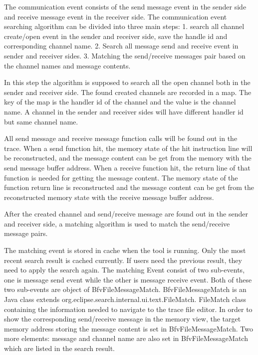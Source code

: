 The communication event consists of the send message event in the sender side and receive message event in the receiver side. The communication event searching algorithm can be divided into three main steps: 1. search all channel create/open event in the sender and receiver side, save the handle id and corresponding channel name. 2. Search all message send and receive event in sender and receiver sides. 3. Matching the send/receive messages pair based on the channel names and message contents.

In this step the algorithm is supposed to search all the open channel both in the sender and receiver side. The found created channels are recorded in a map. The key of the map is the handler id of the channel and the value is the channel name. A channel in the sender and receiver sides will have different handler id but same channel name.

All send message and receive message function calls will be found out in the trace. When a send function hit, the memory state of the hit instruction line will be reconstructed, and the message content can be get from the memory with the send message buffer address. When a receive function hit, the return line of that function is needed for getting the message content. The memory state of the function return line is reconstructed and the message content can be get  from the reconstructed memory state with the receive message buffer address.

After the created channel and send/receive message are found out in the sender and receiver side, a matching algorithm is used to match the send/receive message pairs.

The matching event is stored in cache when the tool is running. Only the most recent search result is cached currently. If users need the previous result, they need to apply the search again. The matching Event consist of two sub-events, one is message send event while the other is message receive event. Both of these two sub-events are object of BfvFileMessageMatch. BfvFileMessageMatch is an Java class extends org.eclipse.search.internal.ui.text.FileMatch. FileMatch class containing the information needed to navigate to the trace file editor. In order to show the corresponding send/receive message in the memory view, the target memory address storing the message content is set in BfvFileMessageMatch. Two more elements: message and channel name are also set in BfvFileMessageMatch which are listed in the search result.

